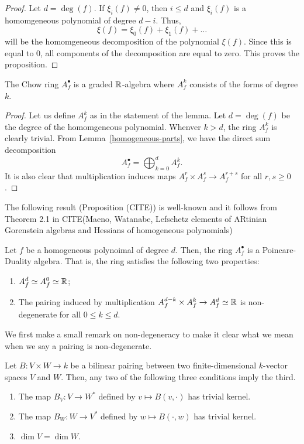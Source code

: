 \documentclass{puthesis-UG}
\begin{document}
\begin{proof}
	Let $d = \deg (f)$. If $\xi_i (f) \neq 0$, then $i \leq d$ and $\xi_i(f)$ is a homomgeneous polynomial of degree $d-i$. Thus, 
	\[
		\xi (f) = \xi_0 (f) + \xi_1(f) + \ldots
	\]
	will be the homomgeneous decomposition of the polynomial $\xi(f)$. Since this is equal to $0$, all components of the decomposition are equal to zero. This proves the proposition. 
\end{proof}

\begin{prop}
	The Chow ring $A_f^\bullet$ is a graded $\mathbb{R}$-algebra where $A_f^k$ consists of the forms of degree $k$. 
\end{prop}

\begin{proof}
	Let us define $A_f^k$ as in the statement of the lemma. Let $d = \deg (f)$ be the degree of the homomgeneous polynomial. Whenver $k > d$, the ring $A_f^k$ is clearly trivial. From Lemma~\ref{homogeneous-parts}, we have the direct sum decomposition 
	\[
		A_f^\bullet = \bigoplus_{k = 0}^d A_f^k.
	\]
	It is also clear that multiplication induces maps $A_f^r \times A_f^s \to A_f^{r+s}$ for all $r, s \geq 0$.
\end{proof}

The following result (Proposition (CITE)) is well-known and it follows from Theorem 2.1 in CITE(Maeno, Watanabe, Lefschetz elements of ARtinian Gorenstein algebras and Hessians of homogeneous polynomials)
\begin{prop} \label{chow-ring-is-a-PD-algebra}
	Let $f$ be a homogeneous polynoimal of degree $d$. Then, the ring $A_f^\bullet$ is a Poincare-Duality algebra. That is, the ring satisfies the following two properties:
	\begin{enumerate}[label = (\alph*)]
		\item $A_f^d \simeq A_f^0 \simeq \mathbb{R}$;

		\item The pairing induced by multiplication $A_f^{d-k} \times A_f^k \to A_f^d \simeq \mathbb{R}$ is non-degenerate for all $0 \leq k \leq d$. 
	\end{enumerate}
\end{prop}

We first make a small remark on non-degeneracy to make it clear what we mean when we say a pairing is non-degenerate. 
\begin{lem} \label{non-degeneracy-definition}
	Let $B : V \times W \to k$ be a bilinear pairing between two finite-dimensional $k$-vector spaces $V$ and $W$. Then, any two of the following three conditions imply the third. 
		\begin{enumerate}[label = (\roman*)]
			\item The map $B_V : V \to W^*$ defined by $v \mapsto B(v, \cdot)$ has trivial kernel.
			\item The map $B_W : W \to V^*$ defined by $w \mapsto B(\cdot, w)$ has trivial kernel. 
			\item $\dim V = \dim W$. 
		\end{enumerate}
	\end{lem}
\end{document}
